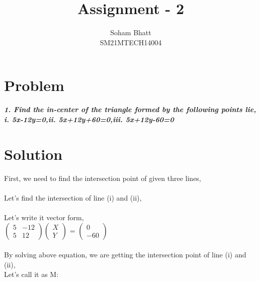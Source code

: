 \documentclass[journal,12pt,twocolumn]{IEEEtran}
\begin{document}
\newcommand{\myvec}[1]{\ensuremath{\begin{pmatrix}#1\end{pmatrix}}}
\newcommand{\cmyvec}[1]{\ensuremath{\begin{pmatrix*}[c]#1\end{pmatrix*}}}
\providecommand{\norm}[1]{\lVert#1\rVert}
\newcommand{\mydet}[1]{\ensuremath{\begin{vmatrix}#1\end{vmatrix}}}
\providecommand{\sbrak}[1]{\ensuremath{{}\left[#1\right]}}
\providecommand{\lsbrak}[1]{\ensuremath{{}\left[#1\right.}}
\providecommand{\rsbrak}[1]{\ensuremath{{}\left.#1\right]}}
\providecommand{\brak}[1]{\ensuremath{\left(#1\right)}}
\providecommand{\lbrak}[1]{\ensuremath{\left(#1\right.}}
\providecommand{\rbrak}[1]{\ensuremath{\left.#1\right)}}
\providecommand{\cbrak}[1]{\ensuremath{\left\{#1\right\}}}
\providecommand{\lcbrak}[1]{\ensuremath{\left\{#1\right.}}
\providecommand{\rcbrak}[1]{\ensuremath{\left.#1\right\}}}
\let\StandardTheFigure\thefigure
\let\vec\mathbf

\title{
Assignment - 2
}
\author{ Soham Bhatt \\SM21MTECH14004}
\maketitle
\newpage
\bigskip

\section*{\textbf{Problem}}
\noindent
\textbf{\textsl{1. Find the in-center of the triangle formed by the following points lie,}}
$$$$
\textbf{\textsl{i. 5x-12y=0,\quad ii. 5x+12y+60=0,\quad iii. 5x+12y-60=0}}
\noindent
\section*{\textbf{Solution}}
\noindent
First, we need to find the intersection point of given three lines, \\
\\
Let's find the intersection of line (i) and (ii),\\
\\
Let's write it vector form,\\

\myvec{5&-12\\5&12}\myvec{X\\Y} = \myvec{0\\-60}\\
\\
By solving above equation, we are getting the intersection point of line (i) and (ii),\\
Let's call it as M:
\\
\end{document}
